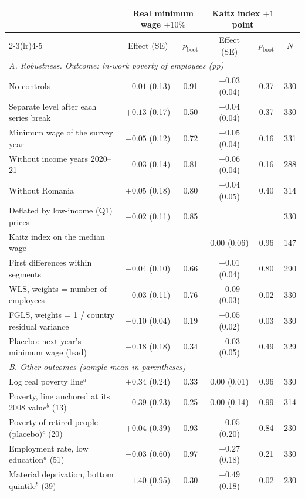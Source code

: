\begin{tabular}{lccccc}
\toprule
 & \multicolumn{2}{c}{Real minimum wage $+10\%$} & \multicolumn{2}{c}{Kaitz index $+1$ point} & \\
\cmidrule(lr){2-3}\cmidrule(lr){4-5}
 & Effect (SE) & $p_{\text{boot}}$ & Effect (SE) & $p_{\text{boot}}$ & $N$ \\
\midrule
\multicolumn{6}{l}{\textit{A. Robustness. Outcome: in-work poverty of employees (pp)}} \\
No controls & $-0.01$ (0.13) & 0.91 & $-0.03$ (0.04) & 0.37 & 330 \\
Separate level after each series break & $+0.13$ (0.17) & 0.50 & $-0.04$ (0.04) & 0.37 & 330 \\
Minimum wage of the survey year & $-0.05$ (0.12) & 0.72 & $-0.05$ (0.04) & 0.16 & 331 \\
Without income years 2020--21 & $-0.03$ (0.14) & 0.81 & $-0.06$ (0.04) & 0.16 & 288 \\
Without Romania & $+0.05$ (0.18) & 0.80 & $-0.04$ (0.05) & 0.40 & 314 \\
Deflated by low-income (Q1) prices & $-0.02$ (0.11) & 0.85 &  &  & 330 \\
Kaitz index on the median wage &  &  & $0.00$ (0.06) & 0.96 & 147 \\
First differences within segments & $-0.04$ (0.10) & 0.66 & $-0.01$ (0.04) & 0.80 & 290 \\
WLS, weights = number of employees & $-0.03$ (0.11) & 0.76 & $-0.09$ (0.03) & 0.02 & 330 \\
FGLS, weights = 1 / country residual variance & $-0.10$ (0.04) & 0.19 & $-0.05$ (0.02) & 0.03 & 330 \\
Placebo: next year's minimum wage (lead) & $-0.18$ (0.18) & 0.34 & $-0.03$ (0.05) & 0.49 & 329 \\
\midrule
\multicolumn{6}{l}{\textit{B. Other outcomes (sample mean in parentheses)}} \\
Log real poverty line$^{a}$ & $+0.34$ (0.24) & 0.33 & $0.00$ (0.01) & 0.96 & 330 \\
Poverty, line anchored at its 2008 value$^{b}$ (13) & $-0.39$ (0.23) & 0.25 & $0.00$ (0.14) & 0.99 & 314 \\
Poverty of retired people (placebo)$^{c}$ (20) & $+0.04$ (0.39) & 0.93 & $+0.05$ (0.20) & 0.84 & 230 \\
Employment rate, low education$^{d}$ (51) & $-0.03$ (0.60) & 0.97 & $-0.27$ (0.18) & 0.21 & 330 \\
Material deprivation, bottom quintile$^{b}$ (39) & $-1.40$ (0.95) & 0.30 & $+0.49$ (0.18) & 0.02 & 230 \\
\bottomrule
\end{tabular}

